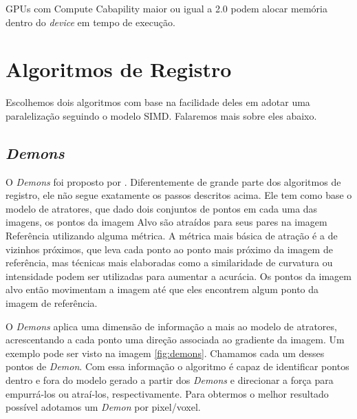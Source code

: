 GPUs com Compute Cabapility maior ou igual a 2.0 podem alocar memória dentro do \textit{device} em tempo de execução.

\section{Algoritmos de Registro}\label{sec:algReg}
    Escolhemos dois algoritmos com base na facilidade deles em adotar uma paralelização seguindo o modelo SIMD.
Falaremos mais sobre eles abaixo.

\subsection{\textit{Demons}}
    O \textit{Demons} foi proposto por \cite{thirion1995fast}. Diferentemente de grande parte dos algoritmos de registro,
ele não segue exatamente os passos descritos acima. Ele tem como base o modelo de atratores, que dado dois conjuntos de pontos
em cada uma das imagens, os pontos da imagem Alvo são atraídos para seus pares na imagem Referência utilizando alguma métrica.
A métrica mais básica de atração é a de vizinhos próximos, que leva cada ponto ao ponto mais próximo da imagem de 
referência, mas técnicas mais elaboradas como a similaridade de curvatura ou intensidade podem ser utilizadas para 
aumentar a acurácia. Os pontos da imagem alvo então movimentam a imagem até que eles encontrem algum ponto da imagem
de referência.

    O \textit{Demons} aplica uma dimensão de informação a mais ao modelo de atratores, acrescentando a cada ponto uma direção
associada ao gradiente da imagem. Um exemplo pode ser visto na imagem \ref{fig:demons}. 
Chamamos cada um desses pontos de \textit{Demon}. Com essa informação o algoritmo é capaz
de identificar pontos dentro e fora do modelo gerado a partir dos \textit{Demons} e direcionar a força para empurrá-los ou
atraí-los, respectivamente. Para obtermos o melhor resultado possível adotamos um \textit{Demon} por pixel/voxel.

